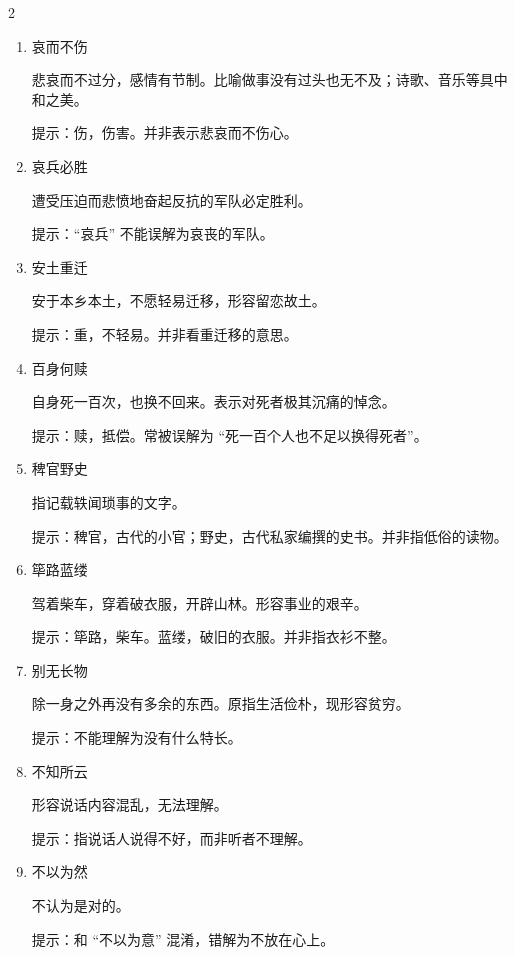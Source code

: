 \documentclass[final,oneside]{ctexbook}
\begin{document}
\begin{multicols}{2}
  \begin{enumerate}
    \item 哀而不伤

      悲哀而不过分，感情有节制。比喻做事没有过头也无不及；诗歌、音乐等具中和之美。

      提示：伤，伤害。并非表示悲哀而不伤心。

    \item 哀兵必胜

      遭受压迫而悲愤地奋起反抗的军队必定胜利。

      提示：“哀兵” 不能误解为哀丧的军队。

    \item 安土重迁

      安于本乡本土，不愿轻易迁移，形容留恋故土。

      提示：重，不轻易。并非看重迁移的意思。

    \item 百身何赎

      自身死一百次，也换不回来。表示对死者极其沉痛的悼念。

      提示：赎，抵偿。常被误解为 “死一百个人也不足以换得死者”。

    \item 稗官野史

      指记载轶闻琐事的文字。

      提示：稗官，古代的小官；野史，古代私家编撰的史书。并非指低俗的读物。

    \item 筚路蓝缕

      驾着柴车，穿着破衣服，开辟山林。形容事业的艰辛。

      提示：筚路，柴车。蓝缕，破旧的衣服。并非指衣衫不整。

    \item 别无长物

      除一身之外再没有多余的东西。原指生活俭朴，现形容贫穷。

      提示：不能理解为没有什么特长。

    \item 不知所云

      形容说话内容混乱，无法理解。

      提示：指说话人说得不好，而非听者不理解。

    \item 不以为然

      不认为是对的。

      提示：和 “不以为意” 混淆，错解为不放在心上。


\end{enumerate}
\end{multicols}
\end{document}
